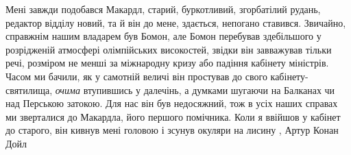 Мені завжди подобався Макардл, старий, буркотливий, згорбатілий рудань,
редактор відділу новий, та й він до мене, здається, непогано ставився.
Звичайно, справжнім нашим владарем був Бомон, але Бомон перебував здебільшого у
розрідженій атмосфері олімпійських високостей, звідки він завважував тільки
речі, розміром не менші за міжнародну кризу або падіння кабінету міністрів.
Часом ми бачили, як у самотній величі він простував до свого
кабінету-святилища, \emph{очима} втупившись у далечінь, а думками шугаючи на Балканах
чи над Перською затокою. Для нас він був недосяжний, тож в усіх наших справах
ми зверталися до Макардла, його першого помічника.  Коли я ввійшов у кабінет до
старого, він кивнув мені головою і зсунув окуляри на лисину
, Артур Конан Дойл

